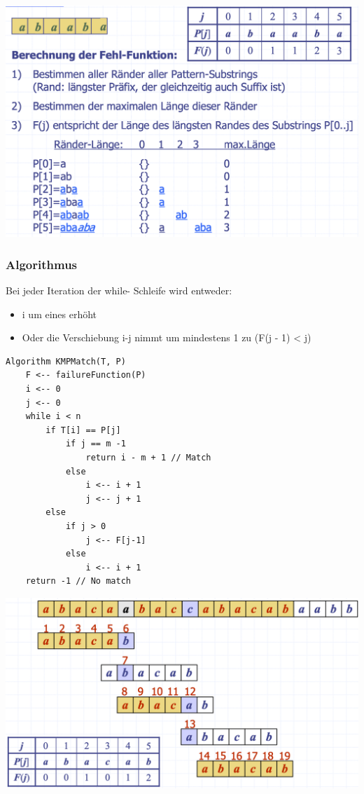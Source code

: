 \vspace{-8pt}
\begin{center}
    \includegraphics[scale=.25]{graphic/08 PatternMatching/KMP Fehl2.png}
\end{center}
\vspace{-8pt}

\subsubsection{Algorithmus}
Bei jeder Iteration der while- Schleife wird entweder:
\begin{itemize}
    \item i um eines erhöht
    \item Oder die Verschiebung i-j nimmt um mindestens 1 zu (F(j - 1) < j)
\end{itemize}
\begin{lstlisting}
Algorithm KMPMatch(T, P)
    F <-- failureFunction(P)
    i <-- 0
    j <-- 0
    while i < n
        if T[i] == P[j]
            if j == m -1
                return i - m + 1 // Match
            else
                i <-- i + 1
                j <-- j + 1
        else
            if j > 0
                j <-- F[j-1]
            else
                i <-- i + 1
    return -1 // No match
\end{lstlisting}
\vspace{-8pt}
\begin{center}
    \includegraphics[scale=.2]{graphic/08 PatternMatching/KMP.png}
\end{center}
\vspace{-8pt}



\newpage